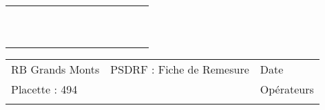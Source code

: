 \documentclass[a4paper, landscape]{article}\usepackage[]{graphicx}\usepackage[]{color}
\begin{document}
{\begin{tabular}{|p{1cm}|p{2cm}|p{1.6cm}|p{1.6cm}|p{1.6cm}|p{1.6cm}|p{1.5cm}|p{1.5cm}|p{1.5cm}|p{1.5cm}|p{1.5cm}|p{7.5cm}|p{5cm}|}
   \rowcolor[gray]{0.95} \hline
 &  &  &  &  &  &  &  &  &  &  &  &  \\ 
   \hline
 &  &  &  &  &  &  &  &  &  &  &  &  \\ 
   \rowcolor[gray]{0.95} \hline
 &  &  &  &  &  &  &  &  &  &  &  &  \\ 
   \hline
 &  &  &  &  &  &  &  &  &  &  &  &  \\ 
   \rowcolor[gray]{0.95} \hline
 &  &  &  &  &  &  &  &  &  &  &  &  \\ 
   \hline
 &  &  &  &  &  &  &  &  &  &  &  &  \\ 
   \rowcolor[gray]{0.95} \hline
 &  &  &  &  &  &  &  &  &  &  &  &  \\ 
   \hline
 &  &  &  &  &  &  &  &  &  &  &  &  \\ 
   \rowcolor[gray]{0.95} \hline
 &  &  &  &  &  &  &  &  &  &  &  &  \\ 
   \hline
 &  &  &  &  &  &  &  &  &  &  &  &  \\ 
   \rowcolor[gray]{0.95} \hline
 &  &  &  &  &  &  &  &  &  &  &  &  \\ 
   \hline
\end{tabular}
}

\begin{tabular}{p{10cm}p{10cm}p{8cm}}
  RB Grands Monts & PSDRF : Fiche de Remesure & Date \\ 
  Placette : 494 &  & Opérateurs \\ 
   &  &  \\ 
  \end{tabular}
\end{document}
